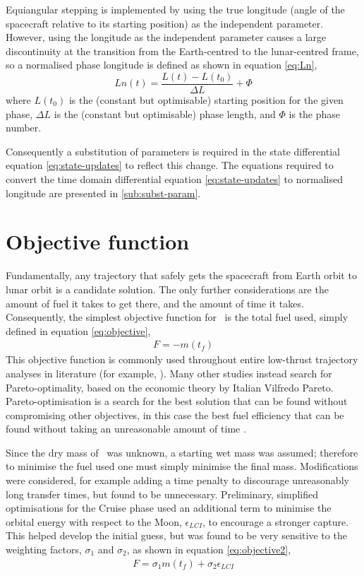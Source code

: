 Equiangular stepping is implemented by using the true longitude (angle of the spacecraft relative to its starting position) as the independent parameter. However, using the longitude as the independent parameter causes a large discontinuity at the transition from the Earth-centred to the lunar-centred frame, so a normalised phase longitude is defined as shown in equation \eqref{eq:Ln},
\begin{equation}
Ln(t) = \frac{L(t)-L(t_0)}{\Delta L}+\Phi \label{eq:Ln}
\end{equation}
where $L(t_0)$ is the (constant but optimisable) starting position for the given phase, $\Delta L$ is the (constant but optimisable) phase length, and $\Phi$ is the phase number. 

Consequently a substitution of parameters is required in the state differential equation \eqref{eq:state-updates} to reflect this change. The equations required to convert the time domain differential equation \eqref{eq:state-updates} to normalised longitude are presented in \autoref{sub:subst-param}.

\section{Objective function} \label{sec:Objective-function}

Fundamentally, any trajectory that safely gets the spacecraft from Earth orbit to lunar orbit is a candidate solution. The only further considerations are the amount of fuel it takes to get there, and the amount of time it takes. Consequently, the simplest objective function for \BW\ is the total fuel used, simply defined in equation \eqref{eq:objective},
\begin{gather}
F = -m(t_f) \label{eq:objective}
\end{gather}
 This objective function is commonly used throughout entire low-thrust trajectory analyses in literature (for example, \cite{Ichimura2008}). Many other studies instead search for Pareto-optimality, based on the economic theory by Italian Vilfredo Pareto. Pareto-optimisation is a search for the best solution that can be found without compromising other objectives, in this case the best fuel efficiency that can be found without taking an unreasonable amount of time \parencite{Lee2005, Coverstone2000}.  

Since the dry mass of \BW\ was unknown, a starting wet mass was assumed; therefore to minimise the fuel used one must simply minimise the final mass. Modifications were considered, for example adding a time penalty to discourage unreasonably long transfer times, but found to be unnecessary. Preliminary, simplified optimisations for the Cruise phase used an additional term to minimise the orbital energy with respect to the Moon, $\epsilon_{LCI}$, to encourage a stronger capture. This helped develop the initial guess, but was found to be very sensitive to the weighting factors, $\sigma_1$ and $\sigma_2$, as shown in equation \eqref{eq:objective2},
\begin{gather}
F = \sigma_1m(t_f)+\sigma_2\epsilon_{LCI} \label{eq:objective2}
\end{gather}
 
